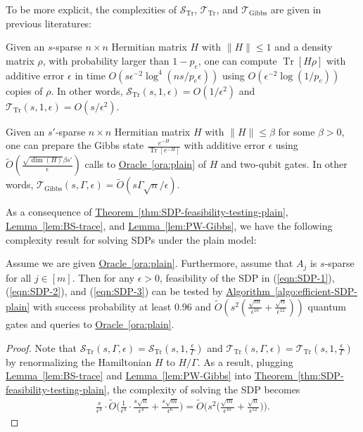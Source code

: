 \documentclass[a4paper,UKenglish,cleveref, autoref]{lipics-v2019}
\theoremstyle{remark}
\numberwithin{equation}{section}
\numberwithin{oracle}{section}
\numberwithin{remark}{section}
\newcommand{\eqn}[1]{(\ref{eqn:#1})}
\newcommand{\ora}[1]{\hyperref[ora:#1]{Oracle~\ref*{ora:#1}}}
\newcommand{\thm}[1]{\hyperref[thm:#1]{Theorem~\ref*{thm:#1}}}
\newcommand{\lem}[1]{\hyperref[lem:#1]{Lemma~\ref*{lem:#1}}}
\newcommand{\algo}[1]{\hyperref[algo:#1]{Algorithm~\ref*{algo:#1}}}
\newcommand{\range}[1]{[#1]}
\DeclareMathOperator{\tr}{Tr}
\DeclareMathOperator{\Tr}{Tr}
\begin{document}
To be more explicit, the complexities of $\mathcal{S}_{\tr}$, $\mathcal{T}_{\tr}$, and $\mathcal{T}_{\text{Gibbs}}$ are given in previous literatures:

\begin{lemma}\label{lem:BS-trace}
Given an $s$-sparse $n\times n$ Hermitian matrix $H$ with $\|H\|\leq 1$ and a density matrix $\rho$, with probability larger than $1-p_{e}$, one can compute $\tr[H\rho]$ with additive error $\epsilon$ in time $O(s\epsilon^{-2}\log^{4}(ns/p_{e}\epsilon))$ using $O(\epsilon^{-2}\log(1/p_{e}))$ copies of $\rho$. In other words, $\mathcal{S}_{\tr}(s,1,\epsilon)=O(1/\epsilon^{2})$ and $\mathcal{T}_{\tr}(s,1,\epsilon)=O(s/\epsilon^{2})$.
\end{lemma}

\begin{lemma}\label{lem:PW-Gibbs}
Given an $s'$-sparse $n\times n$ Hermitian matrix $H$ with $\|H\|\leq \beta$ for some $\beta>0$, one can prepare the Gibbs state $\frac{e^{-H}}{\Tr[e^{-H}]}$ with additive error $\epsilon$ using $\tilde{O}(\frac{\sqrt{\dim(H)}\beta s'}{\epsilon})$ calls to \ora{plain} of $H$ and two-qubit gates. In other words, $\mathcal{T}_{\text{Gibbs}}(s,\Gamma,\epsilon)=\tilde{O}(s\Gamma\sqrt{n}/\epsilon)$.
\end{lemma}

As a consequence of \thm{SDP-feasibility-testing-plain}, \lem{BS-trace}, and \lem{PW-Gibbs}, we have the following complexity result for solving SDPs under the plain model:

\begin{corollary}\label{cor:SDP-feasibility-testing-plain}
Assume we are given \ora{plain}. Furthermore, assume that $A_{j}$ is $s$-sparse for all $j\in\range{m}$. Then for any $\epsilon >0$, feasibility of the SDP in \eqn{SDP-1}, \eqn{SDP-2}, and \eqn{SDP-3} can be tested by \algo{efficient-SDP-plain} with success probability at least 0.96 and $\tilde{O}(s^{2}(\frac{\sqrt{m}}{\epsilon^{10}}+\frac{\sqrt{n}}{\epsilon^{12}}))$ quantum gates and queries to \ora{plain}.
\end{corollary}

\begin{proof}
Note that $\mathcal{S}_{\tr}(s,\Gamma,\epsilon)=\mathcal{S}_{\tr}(s,1,\frac{\epsilon}{\Gamma})$ and $\mathcal{T}_{\tr}(s,\Gamma,\epsilon)=\mathcal{T}_{\tr}(s,1,\frac{\epsilon}{\Gamma})$ by renormalizing the Hamiltonian $H$ to $H/\Gamma$. As a result, plugging \lem{BS-trace} and \lem{PW-Gibbs} into \thm{SDP-feasibility-testing-plain}, the complexity of solving the SDP becomes
\begin{align}
\frac{s}{\epsilon^{4}}\cdot\tilde{O}\Big(\frac{1}{\epsilon^{4}}\cdot\frac{s\sqrt{n}}{\epsilon^{4}}+\frac{s\sqrt{m}}{\epsilon^{6}}\Big)=\tilde{O}\Big(s^{2}\Big(\frac{\sqrt{m}}{\epsilon^{10}}+\frac{\sqrt{n}}{\epsilon^{12}}\Big)\Big).
\end{align}
\end{proof}
\end{document}
